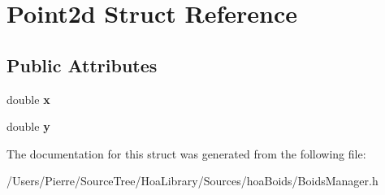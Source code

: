 \hypertarget{struct_point2d}{\section{Point2d Struct Reference}
\label{struct_point2d}
}
\subsection*{Public Attributes}
\begin{DoxyCompactItemize}
\item 
\hypertarget{struct_point2d_a410f46be7d944e2b4aae2c6ccfaae1b5}{double {\bfseries x}}\label{struct_point2d_a410f46be7d944e2b4aae2c6ccfaae1b5}

\item 
\hypertarget{struct_point2d_a39331cc20a1d3950122ab3845edb0689}{double {\bfseries y}}\label{struct_point2d_a39331cc20a1d3950122ab3845edb0689}

\end{DoxyCompactItemize}


The documentation for this struct was generated from the following file\-:\begin{DoxyCompactItemize}
\item 
/\-Users/\-Pierre/\-Source\-Tree/\-Hoa\-Library/\-Sources/hoa\-Boids/Boids\-Manager.\-h\end{DoxyCompactItemize}

